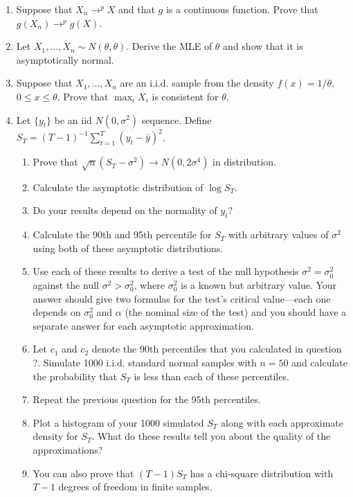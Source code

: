 \begin{enumerate}
\item Suppose that $X_n \to^p X$ and that $g$ is a continuous
  function.  Prove that $g(X_n) \to^p g(X)$.

\item Let $X_1,\dots,X_n \sim N(\theta, \theta)$.  Derive the MLE of $\theta$ and
  show that it is asymptotically normal.

\item Suppose that $X_1,\dots,X_n$ are an i.i.d. sample from the
  density $f(x) = 1/\theta$, $0 \leq x \leq \theta$.  Prove that
  $\max_i X_i$ is consistent for $\theta$.

\item Let $\{y_t\}$ be an iid $N(0,\sigma^2)$ sequence.  Define $S_T =
  (T-1)^{-1} \sum_{t=1}^T (y_t - \bar y)^2$.
  \begin{enumerate}
  \item Prove that $\sqrt{n} (S_T - \sigma^2) \to N(0,2\sigma^4)$ in
    distribution.
  \item Calculate the asymptotic distribution of $\log S_T$.
  \item Do your results depend on the normality of $y_t$?
  \item Calculate the 90th and 95th percentile for $S_T$ with
    arbitrary values of $\sigma^2$ using both of these asymptotic
    distributions.
  \item Use each of these results to derive a test of the null
    hypothesis $\sigma^2 = \sigma_0^2$ against the null $\sigma^2 >
    \sigma_0^2$, where $\sigma_0^2$ is a known but arbitrary value.
    Your answer should give two formulas for the test's critical
    value---each one depends on $\sigma_0^2$ and $\alpha$
    (the nominal size of the test) and you should have a separate
    answer for each asymptotic approximation.
  \item Let $c_1$ and $c_2$ denote the 90th percentiles that you
    calculated in question ?.  Simulate 1000 i.i.d. standard normal
    samples with $n = 50$ and calculate the probability that $S_T$ is
    less than each of these percentiles.
  \item Repeat the previous question for the 95th percentiles.
  \item Plot a histogram of your 1000 simulated $S_T$ along with each
    approximate density for $S_T$.  What do these results tell you
    about the quality of the approximations?
  \item You can also prove that $(T-1) S_T$ has a chi-square
    distribution with $T-1$ degrees of freedom in finite samples.

\end{enumerate}
\end{enumerate}
